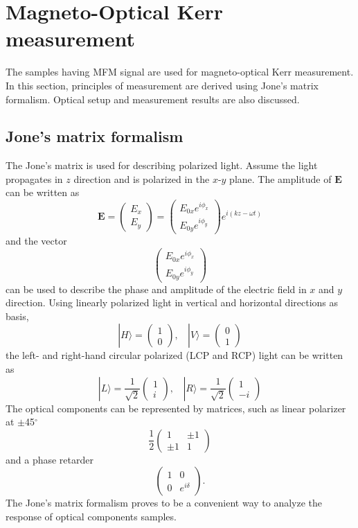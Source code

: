 \documentclass[pdflatex, sectionletters, 12pt]{pittetd}    %
\begin{document}
\section{Magneto-Optical Kerr measurement}

The samples having MFM signal are used for magneto-optical Kerr measurement. In this section, principles of measurement are derived using Jone's matrix formalism. Optical setup and measurement results are also discussed.

\subsection{Jone's matrix formalism}

The Jone's matrix is used for describing polarized light. Assume the light propagates in $z$ direction and is polarized in the $x$-$y$ plane. The amplitude of $\mathbf{E}$ can be written as
$$
\mathbf{E} = 
\begin{pmatrix}
E_x \\
E_y
\end{pmatrix}
=
\begin{pmatrix}
E_{0x} e^{i\phi_x} \\
E_{0y} e^{i\phi_y}
\end{pmatrix}
e^{i(kz - \omega t)}
$$
and the vector 
$$
\begin{pmatrix}
E_{0x} e^{i\phi_x} \\
E_{0y} e^{i\phi_y}
\end{pmatrix}
$$
can be used to describe the phase and amplitude of the electric field in $x$ and $y$ direction. Using linearly polarized light in vertical and horizontal directions as basis, 
$$
|H \rangle = 
\begin{pmatrix}
1 \\
0
\end{pmatrix}, \ \ \ \
|V \rangle = 
\begin{pmatrix}
0 \\
1
\end{pmatrix}
$$
the left- and right-hand circular polarized (LCP and RCP) light can be written as
$$
|L \rangle = \frac{1}{\sqrt{2}}
\begin{pmatrix}
1 \\
i
\end{pmatrix}, \ \ \ \
|R \rangle = \frac{1}{\sqrt{2}}
\begin{pmatrix}
1 \\
-i
\end{pmatrix}
$$
The optical components can be represented by matrices, such as linear polarizer at $\pm$45$^{\circ}$
$$
\frac{1}{2}
\begin{pmatrix}
1 & \pm 1 \\
\pm 1 & 1
\end{pmatrix}
$$
and a phase retarder
$$
\begin{pmatrix}
1 & 0 \\
0 & e^{i\delta}
\end{pmatrix}.
$$
The Jone's matrix formalism proves to be a convenient way to analyze the response of optical components samples.
\end{document}

